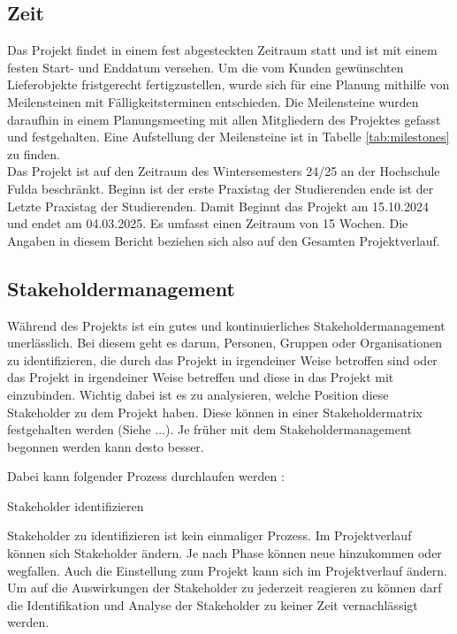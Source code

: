 \documentclass[ThesisDJ.tex]{subfiles}
\begin{document}
\subsection{Zeit}
Das Projekt findet in einem fest abgesteckten Zeitraum statt und ist mit einem festen Start- und Enddatum versehen.
Um die vom Kunden gewünschten Lieferobjekte fristgerecht fertigzustellen, wurde sich für eine Planung mithilfe von Meilensteinen mit
Fälligkeitsterminen entschieden. Die Meilensteine wurden daraufhin in einem Planungsmeeting mit allen Mitgliedern des Projektes gefasst und festgehalten.
Eine Aufstellung der Meilensteine ist in Tabelle \ref{tab:milestones} zu finden.\\

Das Projekt ist auf den Zeitraum des Wintersemesters 24/25 an der Hochschule Fulda beschränkt.
Beginn ist der erste Praxistag der Studierenden ende ist der Letzte Praxistag der Studierenden. 
Damit Beginnt das Projekt am 15.10.2024 und endet am 04.03.2025. Es umfasst einen Zeitraum von 15 Wochen. 
Die Angaben in diesem Bericht beziehen sich also auf den Gesamten Projektverlauf.

\subsection{Stakeholdermanagement}

Während des Projekts ist ein gutes und kontinuierliches Stakeholdermanagement unerlässlich. 
Bei diesem geht es darum, Personen, Gruppen oder Organisationen zu identifizieren, die durch das Projekt in irgendeiner Weise betroffen sind oder das
Projekt in irgendeiner Weise betreffen und diese in das Projekt mit einzubinden. Wichtig dabei ist es zu analysieren, welche Position 
diese Stakeholder zu dem Projekt haben. Diese können in einer Stakeholdermatrix festgehalten werden (Siehe ...). 
Je früher mit dem Stakeholdermanagement begonnen werden kann desto besser.

Dabei kann folgender Prozess durchlaufen werden \cite[S.~487]{project_management_institute_guide_2017}:

Stakeholder identifizieren

Stakeholder zu identifizieren ist kein einmaliger Prozess. Im Projektverlauf können sich Stakeholder ändern. 
Je nach Phase können neue hinzukommen oder wegfallen. Auch die Einstellung zum Projekt kann sich im Projektverlauf ändern. 
Um auf die Auswirkungen der Stakeholder zu jederzeit reagieren zu können darf die Identifikation und Analyse der Stakeholder 
zu keiner Zeit vernachlässigt werden.
\end{document}
